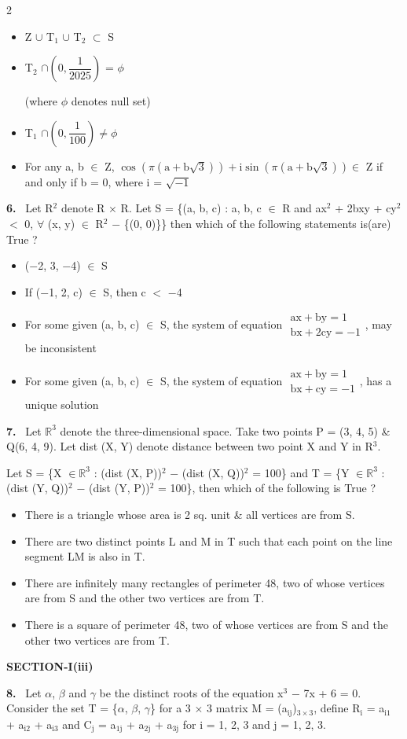 \documentclass[10pt]{extarticle}
\newcommand{\sect}[1]{\par\smallskip\noindent\textbf{#1}\par}
\newcommand{\qn}[1]{\par\smallskip\noindent\textbf{#1.}~}
\newenvironment{qoptions}{\begin{itemize}[leftmargin=1.8em,itemsep=1pt,topsep=2pt,label={}]}{\end{itemize}}
\newcommand{\opt}[2]{\item[(#1)] #2}
\begin{document}
\begin{multicols}{2}
\begin{qoptions}
\opt{A}{Z $\cup$ T$_1$ $\cup$ T$_2$ $\subset$ S}
\opt{B}{T$_2$ $\cap\left(0,\dfrac1{2025}\right)$ = $\phi$\par (where $\phi$ denotes null set)}
\opt{C}{T$_1$ $\cap\left(0,\dfrac1{100}\right)\neq\phi$}
\opt{D}{For any a, b $\in$ Z, $\cos\left(\pi\left(\mathrm a+\mathrm b\sqrt3\right)\right)+\mathrm i\sin\left(\pi\left(\mathrm a+\mathrm b\sqrt3\right)\right)\in$ Z if and only if b = 0, where i = $\sqrt{-1}$}
\end{qoptions}
\qn{6} Let R$^2$ denote R $\times$ R. Let S = \{(a, b, c) : a, b, c $\in$ R and ax$^2$ + 2bxy + cy$^2$ $<$ 0, $\forall$ (x, y) $\in$ R$^2$ $-$ \{(0, 0)\}\} then which of the following statements is(are) True ?
\begin{qoptions}
\opt{A}{($-$2, 3, $-$4) $\in$ S}
\opt{B}{If ($-$1, 2, c) $\in$ S, then c $<$ $-$4}
\opt{C}{For some given (a, b, c) $\in$ S, the system of equation $\begin{array}{l}\mathrm{ax+by}=1\\\mathrm{bx+2cy}=-1\end{array}$, may be inconsistent}
\opt{D}{For some given (a, b, c) $\in$ S, the system of equation $\begin{array}{l}\mathrm{ax+by}=1\\\mathrm{bx+cy}=-1\end{array}$, has a unique solution}
\end{qoptions}
\qn{7} Let $\mathbb R^3$ denote the three-dimensional space. Take two points P = (3, 4, 5) \& Q(6, 4, 9). Let dist (X, Y) denote distance between two point X and Y in R$^3$.\par
Let S = \{X $\in\mathbb R^3$ : (dist (X, P))$^2$ $-$ (dist (X, Q))$^2$ = 100\} and T = \{Y $\in\mathbb R^3$ : (dist (Y, Q))$^2$ $-$ (dist (Y, P))$^2$ = 100\}, then which of the following is True ?
\begin{qoptions}
\opt{A}{There is a triangle whose area is 2 sq. unit \& all vertices are from S.}
\opt{B}{There are two distinct points L and M in T such that each point on the line segment LM is also in T.}
\opt{C}{There are infinitely many rectangles of perimeter 48, two of whose vertices are from S and the other two vertices are from T.}
\opt{D}{There is a square of perimeter 48, two of whose vertices are from S and the other two vertices are from T.}
\end{qoptions}
\sect{SECTION-I(iii)}
\qn{8} Let $\alpha$, $\beta$ and $\gamma$ be the distinct roots of the equation x$^3$ $-$ 7x + 6 = 0. Consider the set T = \{$\alpha$, $\beta$, $\gamma$\} for a 3 $\times$ 3 matrix M = (a$_{\mathrm{ij}}$)$_{3\times3}$, define R$_\mathrm i$ = a$_{\mathrm{i1}}$ + a$_{\mathrm{i2}}$ + a$_{\mathrm{i3}}$ and C$_\mathrm j$ = a$_{\mathrm{1j}}$ + a$_{\mathrm{2j}}$ + a$_{\mathrm{3j}}$ for i = 1, 2, 3 and j = 1, 2, 3.\par

\end{multicols}
\end{document}
